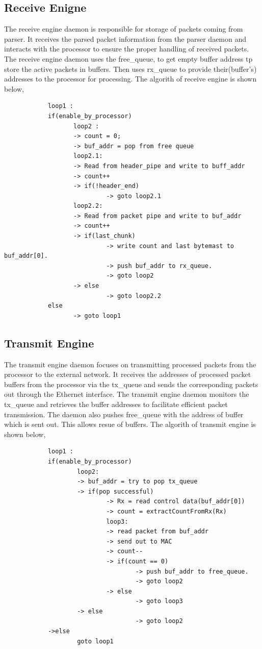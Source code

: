 \documentclass[a4paper,11pt, final]{report}
\begin{document}
		\subsection{Receive Enigne}
				The receive engine daemon is responsible for storage of packets coming from parser. It receives the parsed packet information from the parser daemon and interacts with the processor to ensure the proper handling of received packets. The receive engine daemon uses the free\_queue, to get empty buffer address tp store the active packets in buffers.
			Then uses rx\_queue to provide their(buffer's) addresses to the processor for processing. The algorith of receive engine is shown below,
		\begin{verbatim}
			loop1 :
			if(enable_by_processor)
			       loop2 :
			       -> count = 0;
			       -> buf_addr = pop from free queue
			       loop2.1:
			       -> Read from header_pipe and write to buff_addr
			       -> count++
			       -> if(!header_end)
			       	        -> goto loop2.1
			       loop2.2:
			       -> Read from packet pipe and write to buf_addr 
			       -> count++
			       -> if(last_chunk)
			       	        -> write count and last bytemast to buf_addr[0].
			       	        -> push buf_addr to rx_queue.
			                -> goto loop2
			       -> else
			       	        -> goto loop2.2
			else
			       -> goto loop1
		\end{verbatim}

		\subsection{Transmit Engine}
				The transmit engine daemon focuses on transmitting processed packets from the processor to the external network. It receives the addresses of processed packet buffers from the processor via the tx\_queue and sends the corresponding packets out through the Ethernet interface. The transmit engine daemon monitors the tx\_queue and retrieves the buffer addresses to facilitate efficient packet transmission. The daemon also pushes free\_queue with the address of buffer which is sent out. This allows resue of buffers. The algorith of transmit engine is shown below,
		\begin{verbatim}
			loop1 : 
			if(enable_by_processor)
			        loop2:
			        -> buf_addr = try to pop tx_queue
			        -> if(pop successful)
			                -> Rx = read control data(buf_addr[0]) 
			                -> count = extractCountFromRx(Rx)
			                loop3:
			                -> read packet from buf_addr
			                -> send out to MAC
			                -> count--
			                -> if(count == 0)
			                        -> push buf_addr to free_queue.
			                        -> goto loop2 
			                -> else
			                        -> goto loop3
			        -> else
			                        -> goto loop2
			->else
			        goto loop1
		\end{verbatim}
\end{document}
